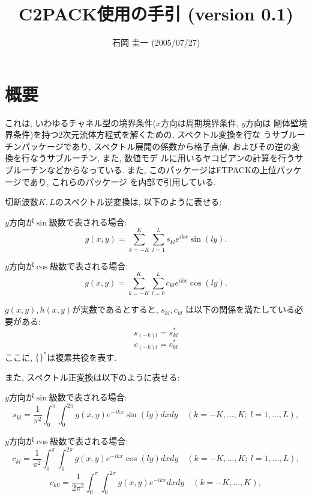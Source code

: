 \documentclass[a4j,fleqn]{jarticle}
\title{C2PACK使用の手引 (version 0.1)}
\author{石岡 圭一  (2005/07/27)}
\date{}
\begin{document}
\maketitle

\section{概要}

これは, いわゆるチャネル型の境界条件($x$方向は周期境界条件, $y$方向は
剛体壁境界条件)を持つ2次元流体方程式を解くための, スペクトル変換を行な
うサブルーチンパッケージであり, スペクトル展開の係数から格子点値, 
およびその逆の変換を行なうサブルーチン, また, 数値モデ
ルに用いるヤコビアンの計算を行うサブルーチンなどからなっている. 
また, このパッケージはFTPACKの上位パッケージであり, これらのパッケージ
を内部で引用している. 

切断波数$K,L$のスペクトル逆変換は, 以下のように表せる:

$y$方向が$\sin$級数で表される場合:
\begin{equation}
g(x,y)=\sum^K_{k=-K}\sum^L_{l=1}s_{kl}e^{ikx}\sin(ly).
\end{equation}

$y$方向が$\cos$級数で表される場合:
\begin{equation}
g(x,y)=\sum^K_{k=-K}\sum^L_{l=0}c_{kl}e^{ikx}\cos(ly).
\end{equation}

$g(x,y),h(x,y)$が実数であるとすると, $s_{kl},c_{kl}$
は以下の関係を満たしている必要がある:
\begin{equation}
s_{(-k)l}=s_{kl}^{*}
\end{equation}
\begin{equation}
c_{(-k)l}=c_{kl}^{*}
\end{equation}
ここに, $\{ \}^{*}$は複素共役を表す.

また, スペクトル正変換は以下のように表せる:

$y$方向が$\sin$級数で表される場合:
\begin{equation}
s_{kl}=\frac1{\pi^2}\int^{\pi}_0\int^{2\pi}_0
g(x,y)e^{-ikx}\sin(ly)dxdy \quad (k=-K,\ldots,K;\ l=1,\ldots,L),
\end{equation}

$y$方向が$\cos$級数で表される場合:
\begin{equation}
c_{kl}=\frac1{\pi^2}\int^{\pi}_0\int^{2\pi}_0
g(x,y)e^{-ikx}\cos(ly)dxdy \quad (k=-K,\ldots,K;\ l=1,\ldots,L),
\end{equation}
\begin{equation}
c_{k0}=\frac1{2\pi^2}\int^{\pi}_0\int^{2\pi}_0
g(x,y)e^{-ikx}dxdy \quad (k=-K,\ldots,K),
\end{equation}
\end{document}
